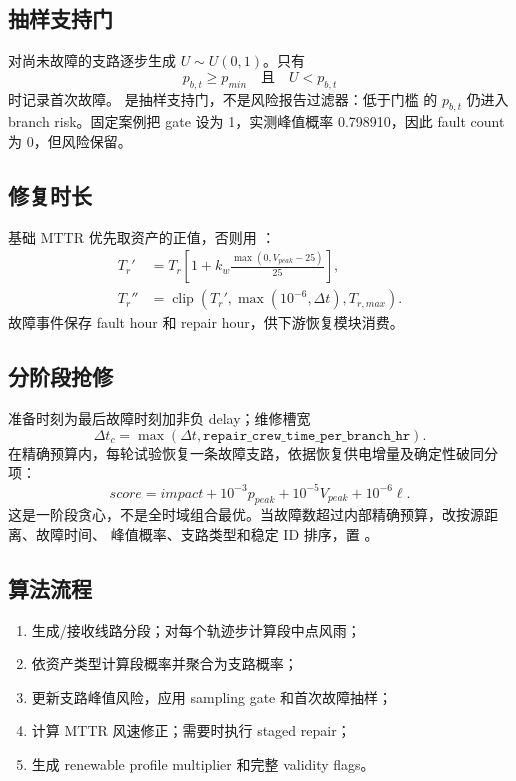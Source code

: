 \subsection{抽样支持门}
对尚未故障的支路逐步生成 $U\sim U(0,1)$。只有
\begin{equation}
 p_{b,t}\ge p_{min}\quad\text{且}\quad U<p_{b,t}
\end{equation}
时记录首次故障。 是抽样支持门，不是风险报告过滤器：低于门槛
的 $p_{b,t}$ 仍进入 branch risk。固定案例把 gate 设为 1，实测峰值概率 0.798910，因此
fault count 为 0，但风险保留。

\subsection{修复时长}
基础 MTTR 优先取资产的正值，否则用 ：
\begin{align}
 T_r'&=T_r\left[1+k_w\frac{\max(0,V_{peak}-25)}{25}\right],\\
 T_r''&=\operatorname{clip}(T_r',\max(10^{-6},\Delta t),T_{r,max}).
\end{align}
故障事件保存 fault hour 和 repair hour，供下游恢复模块消费。

\subsection{分阶段抢修}
准备时刻为最后故障时刻加非负 delay；维修槽宽
\begin{equation}
 \Delta t_c=\max(\Delta t,\texttt{repair\_crew\_time\_per\_branch\_hr}).
\end{equation}
在精确预算内，每轮试验恢复一条故障支路，依据恢复供电增量及确定性破同分项：
\begin{equation}
 score=impact+10^{-3}p_{peak}+10^{-5}V_{peak}+10^{-6}\ell.
\end{equation}
这是一阶段贪心，不是全时域组合最优。当故障数超过内部精确预算，改按源距离、故障时间、
峰值概率、支路类型和稳定 ID 排序，置 。

\subsection{算法流程}
\begin{enumerate}
  \item 生成/接收线路分段；对每个轨迹步计算段中点风雨；
  \item 依资产类型计算段概率并聚合为支路概率；
  \item 更新支路峰值风险，应用 sampling gate 和首次故障抽样；
  \item 计算 MTTR 风速修正；需要时执行 staged repair；
  \item 生成 renewable profile multiplier 和完整 validity flags。
\end{enumerate}

